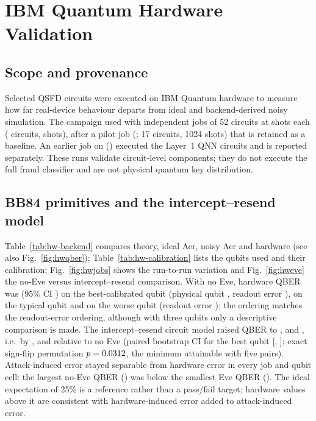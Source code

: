 \section{IBM Quantum Hardware Validation}\label{sec:hw}
\subsection{Scope and provenance}
Selected QSFD circuits were executed on IBM Quantum hardware to measure how far real-device behaviour departs from ideal and backend-derived noisy simulation. The campaign used \HwBackend{} with \HwJobs{} independent jobs of 52 circuits at \HwShots{} shots each (\HwCircuits{} circuits, \HwTotalShots{} shots), after a pilot job (\HwPilotJob{}; 17 circuits, 1024 shots) that is retained as a baseline. An earlier job on  (\HwFezJob{}) executed the Layer~1 QNN circuits and is reported separately. These runs validate circuit-level components; they do not execute the full fraud classifier and are not physical quantum key distribution.

\subsection{BB84 primitives and the intercept--resend model}
Table~\ref{tab:hw-backend} compares theory, ideal Aer, noisy Aer and hardware (see also Fig.~\ref{fig:hwqber}); Table~\ref{tab:hw-calibration} lists the qubits used and their calibration; Fig.~\ref{fig:hwjobs} shows the run-to-run variation and Fig.~\ref{fig:hweve} the no-Eve versus intercept--resend comparison. With no Eve, hardware QBER was \HwNoEveBest{} (95\% CI \HwNoEveCIBest{}) on the best-calibrated qubit (physical qubit \HwQubitBest{}, readout error \HwReadoutBest{}), \HwNoEveTypical{} on the typical qubit and \HwNoEveWorse{} on the worse qubit (readout error \HwReadoutWorse{}); the ordering matches the readout-error ordering, although with three qubits only a descriptive comparison is made. The intercept--resend circuit model raised QBER to \HwEveBest{}, \HwEveTypical{} and \HwEveWorse{}, i.e.\ by \HwDeltaBest{}, \HwDeltaTypical{} and \HwDeltaWorse{} relative to no Eve (paired bootstrap CI for the best qubit [\HwDeltaBootLoBest{}, \HwDeltaBootHiBest{}]; exact sign-flip permutation $p=0.0312{}$, the minimum attainable with five pairs). Attack-induced error stayed separable from hardware error in every job and qubit cell: the largest no-Eve QBER (\HwMaxNoEve{}) was below the smallest Eve QBER (\HwMinEve{}). The ideal expectation of 25\% is a reference rather than a pass/fail target; hardware values above it are consistent with hardware-induced error added to attack-induced error.

